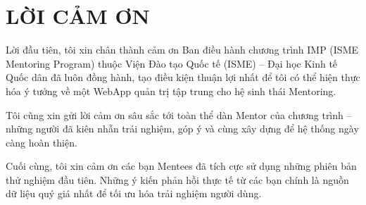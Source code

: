 \chapter*{LỜI CẢM ƠN}
Lời đầu tiên, tôi xin chân thành cảm ơn Ban điều hành chương trình IMP (ISME Mentoring Program) thuộc Viện Đào tạo Quốc tế (ISME) -- Đại học Kinh tế Quốc dân đã luôn đồng hành, tạo điều kiện thuận lợi nhất để tôi có thể hiện thực hóa ý tưởng về một WebApp quản trị tập trung cho hệ sinh thái Mentoring.

Tôi cũng xin gửi lời cảm ơn sâu sắc tới toàn thể dàn Mentor của chương trình -- những người đã kiên nhẫn trải nghiệm, góp ý và cùng xây dựng để hệ thống ngày càng hoàn thiện.

Cuối cùng, tôi xin cảm ơn các bạn Mentees đã tích cực sử dụng những phiên bản thử nghiệm đầu tiên. Những ý kiến phản hồi thực tế từ các bạn chính là nguồn dữ liệu quý giá nhất để tối ưu hóa trải nghiệm người dùng.
